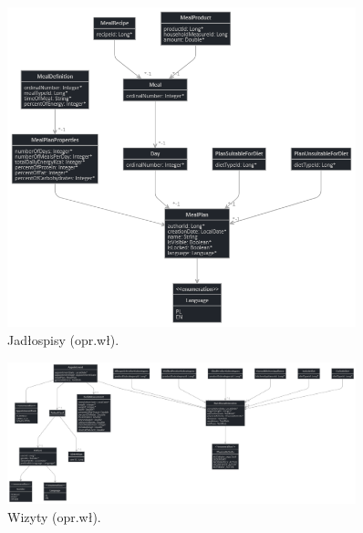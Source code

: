 \begin{minipage}{\textwidth}
    \begin{figure}[H]
        \centering\includegraphics[width=0.9\textwidth]{img/class-diagrams/jadospisy.png}
        \caption{Jadłospisy (opr.wł).}\label{rysunek:jadlospisy}
    \end{figure}
\end{minipage}

\begin{minipage}{\textwidth}
    \begin{figure}[H]
        \centering\includegraphics[width=0.9\textwidth]{img/class-diagrams/wizyty.png}
        \caption{Wizyty (opr.wł).}\label{rysunek:wizyty}
    \end{figure}
\end{minipage}

\thispagestyle{normal}
